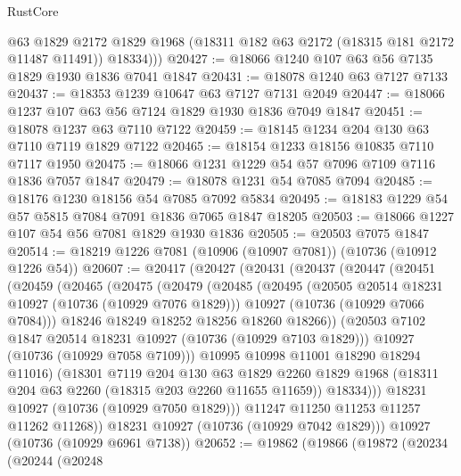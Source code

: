 \begin{lexlean}{RustCore}
\begin{coremodule}
          @63
          @1829
          @2172
          @1829
          @1968
          (@18311 @182 @63 @2172 (@18315 @181 @2172 @11487 @11491))
          @18334)))
@20427 := @18066 @1240 @107 @63 @56 @7135 @1829 @1930 @1836 @7041 @1847
@20431 := @18078 @1240 @63 @7127 @7133
@20437 := @18353 @1239 @10647 @63 @7127 @7131 @2049
@20447 := @18066 @1237 @107 @63 @56 @7124 @1829 @1930 @1836 @7049 @1847
@20451 := @18078 @1237 @63 @7110 @7122
@20459 := @18145 @1234 @204 @130 @63 @7110 @7119 @1829 @7122
@20465 := @18154 @1233 @18156 @10835 @7110 @7117 @1950
@20475 := @18066 @1231 @1229 @54 @57 @7096 @7109 @7116 @1836 @7057 @1847
@20479 := @18078 @1231 @54 @7085 @7094
@20485 := @18176 @1230 @18156 @54 @7085 @7092 @5834
@20495 := @18183 @1229 @54 @57 @5815 @7084 @7091 @1836 @7065 @1847 @18205
@20503 := @18066 @1227 @107 @54 @56 @7081 @1829 @1930 @1836
@20505 := @20503 @7075 @1847
@20514 := @18219 @1226 @7081 (@10906 (@10907 @7081)) (@10736 (@10912 @1226 @54))
@20607 := @20417
    (@20427
      (@20431
        (@20437
          (@20447
            (@20451
              (@20459
                (@20465
                  (@20475
                    (@20479
                      (@20485
                        (@20495
                          (@20505 @20514 @18231 @10927 (@10736 (@10929 @7076 @1829)))
                          @10927
                          (@10736 (@10929 @7066 @7084)))
                        @18246
                        @18249
                        @18252
                        @18256
                        @18260
                        @18266))
                    (@20503 @7102 @1847 @20514 @18231 @10927 (@10736 (@10929 @7103 @1829)))
                    @10927
                    (@10736 (@10929 @7058 @7109)))
                  @10995
                  @10998
                  @11001
                  @18290
                  @18294
                  @11016)
                (@18301
                  @7119
                  @204
                  @130
                  @63
                  @1829
                  @2260
                  @1829
                  @1968
                  (@18311 @204 @63 @2260 (@18315 @203 @2260 @11655 @11659))
                  @18334)))
            @18231
            @10927
            (@10736 (@10929 @7050 @1829)))
          @11247
          @11250
          @11253
          @11257
          @11262
          @11268))
      @18231
      @10927
      (@10736 (@10929 @7042 @1829)))
    @10927
    (@10736 (@10929 @6961 @7138))
@20652 := @19862
    (@19866
      (@19872
        (@20234
          (@20244
            (@20248

\end{coremodule}
\end{lexlean}
